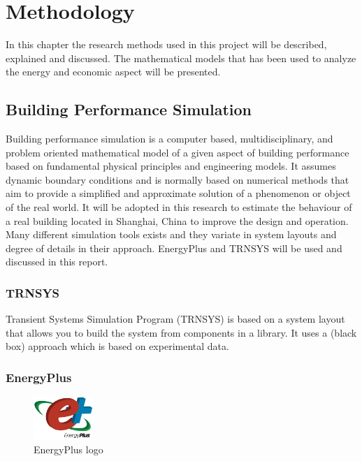 \chapter{Methodology}
In this chapter the research methods used in this project will be described, explained and discussed. The mathematical models that has been used to analyze the energy and economic aspect will be presented. 

\section{Building Performance Simulation}

Building performance simulation is a computer based, multidisciplinary, and problem oriented mathematical model of a given aspect of building performance based on fundamental physical principles and engineering models. It assumes dynamic boundary conditions and is normally based on numerical methods that aim to provide a simplified and approximate solution of a phenomenon or object of the real world. It will be adopted in this research to estimate the behaviour of a real building located in Shanghai, China to improve the design and operation. Many different simulation tools exists and they variate in system layouts and degree of details in their approach. EnergyPlus and TRNSYS will be used and discussed in this report.

\subsection{TRNSYS}
Transient Systems Simulation Program (\ac{TRNSYS}) is based on a system layout that allows you to build the system from components in a library. It uses a (black box) approach which is based on experimental data.

\subsection{EnergyPlus}

\begin{figure}
    \centering
    \vspace{-6mm}
    \includegraphics[width=0.2\textwidth]{vedlegg/e+.png}
    \caption{EnergyPlus logo}
    \vspace{-5mm}
    \label{fig:e+}
 \end{figure}
 
